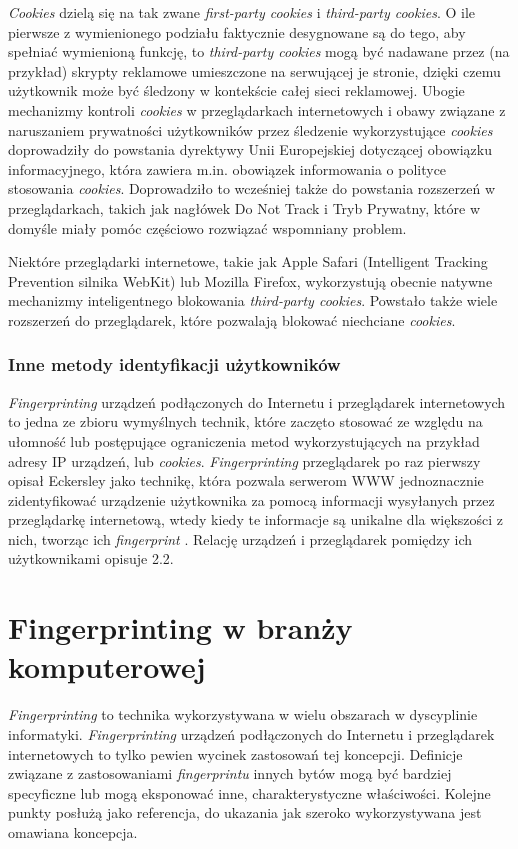 \emph{Cookies} dzielą się na tak zwane \emph{first-party cookies} i
\emph{third-party cookies}. O ile pierwsze z wymienionego podziału faktycznie
desygnowane są do tego, aby spełniać wymienioną funkcję, to \emph{third-party
cookies} mogą być nadawane przez (na przykład) skrypty reklamowe umieszczone na
serwującej je stronie, dzięki czemu użytkownik może być śledzony w kontekście
całej sieci reklamowej. Ubogie mechanizmy kontroli \emph{cookies} w
przeglądarkach internetowych i obawy związane z naruszaniem prywatności
użytkowników przez śledzenie wykorzystujące \emph{cookies} doprowadziły do
powstania dyrektywy Unii Europejskiej dotyczącej obowiązku informacyjnego, która
zawiera m.in. obowiązek informowania o polityce stosowania \emph{cookies}.
Doprowadziło to wcześniej także do powstania rozszerzeń w przeglądarkach, takich
jak nagłówek Do Not Track i Tryb Prywatny, które w domyśle miały pomóc częściowo
rozwiązać wspomniany problem.

Niektóre przeglądarki internetowe, takie jak Apple Safari (Intelligent Tracking
Prevention silnika WebKit) lub Mozilla Firefox, wykorzystują obecnie natywne
mechanizmy inteligentnego blokowania \emph{third-party cookies}. Powstało także
wiele rozszerzeń do przeglądarek, które pozwalają blokować niechciane
\emph{cookies}.

\subsubsection{Inne metody identyfikacji użytkowników}
\emph{Fingerprinting} urządzeń podłączonych do Internetu i przeglądarek
internetowych to jedna ze zbioru wymyślnych technik, które zaczęto stosować ze
względu na ułomność lub postępujące ograniczenia metod wykorzystujących na
przykład adresy IP urządzeń, lub \emph{cookies}. \emph{Fingerprinting}
przeglądarek po raz pierwszy opisał Eckersley jako technikę, która pozwala
serwerom WWW jednoznacznie zidentyfikować urządzenie użytkownika za pomocą
informacji wysyłanych przez przeglądarkę internetową, wtedy kiedy te informacje
są unikalne dla większości z nich, tworząc ich \emph{fingerprint}
\cite{eckersley2010unique}. Relację urządzeń i przeglądarek pomiędzy ich
użytkownikami opisuje 2.2.

\section{Fingerprinting w branży komputerowej}
\emph{Fingerprinting} to technika wykorzystywana w wielu obszarach w dyscyplinie
informatyki. \emph{Fingerprinting} urządzeń podłączonych do Internetu i
przeglądarek internetowych to tylko pewien wycinek zastosowań tej koncepcji.
Definicje związane z zastosowaniami \emph{fingerprintu} innych bytów mogą być
bardziej specyficzne lub mogą eksponować inne, charakterystyczne właściwości.
Kolejne punkty posłużą jako referencja, do ukazania jak szeroko wykorzystywana
jest omawiana koncepcja.

